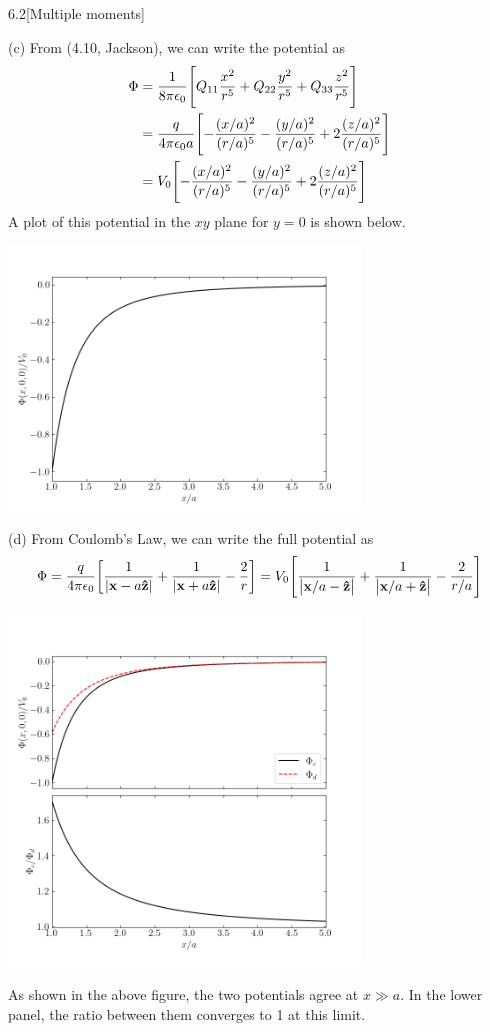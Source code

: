 \documentclass[12pt]{article}
\begin{document}
\begin{problem}{6.2}[Multiple moments]
\begin{solution}
(c) From (4.10, Jackson), we can write the potential as
\begin{align}
    \Phi
    &=\frac1{8\pi\epsilon_0}\qty[Q_{11}\frac{x^2}{r^5}+Q_{22}\frac{y^2}{r^5}+Q_{33}\frac{z^2}{r^5}]
    \notag\\
    &=\frac{q}{4\pi\epsilon_0a}\qty[-\frac{(x/a)^2}{(r/a)^5}-\frac{(y/a)^2}{(r/a)^5}+2\frac{(z/a)^2}{(r/a)^5}]\notag\\
    &=V_0\qty[-\frac{(x/a)^2}{(r/a)^5}-\frac{(y/a)^2}{(r/a)^5}+2\frac{(z/a)^2}{(r/a)^5}]
\end{align}
A plot of this potential in the $xy$ plane for $y=0$ is shown below.
\begin{center}
    \includegraphics[width=0.7\textwidth]{p2c.png} 
\end{center}

(d) From Coulomb's Law, we can write the full potential as
\begin{equation}
    \Phi=\frac{q}{4\pi\epsilon_0}\qty[\frac1{\abs{\vb{x}-a\vb{\hat{z}}}}+\frac1{\abs{\vb{x}+a\vb{\hat{z}}}}-\frac2r] 
    =V_0\qty[\frac1{\abs{\vb{x}/a-\vb{\hat{z}}}}+\frac1{\abs{\vb{x}/a+\vb{\hat{z}}}}-\frac2{r/a}]
\end{equation}
\begin{center}
    \includegraphics[width=0.7\textwidth]{p2d.png} 
\end{center}
As shown in the above figure, the two potentials agree at $x\gg a$. In the lower
panel, the ratio between them converges to 1 at this limit.
\end{solution}
\end{problem}
\end{document}
